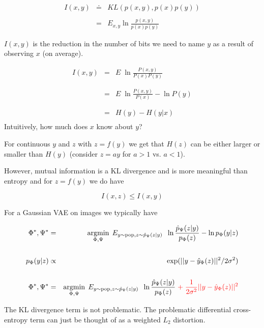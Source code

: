 {\vfill
\begin{eqnarray*}
  I(x,y) & \doteq & KL(p(x,y),p(x)p(y)) \\
  \\
  & = & E_{x,y} \ln \frac{p(x,y)}{p(x)p(y)}
\end{eqnarray*}


$I(x,y)$ is the reduction in the number of bits we need to name $y$ as a result of observing $x$ (on average).

{\huge
\begin{eqnarray*}
I(x,y) & = & E \;\ln \frac{P(x,y)}{P(x)P(y)} \\
\\
\\
& = & E \;\ln \frac{P(x,y)}{P(x)} - \ln P(y) \\
\\
\\
& = & H(y) - H(y|x) \\
\end{eqnarray*}
}
Intuitively, how much does $x$ know about $y$?


For continuous $y$ and $z$ with $z = f(y)$ we get that $H(z)$ can be either larger or smaller than $H(y)$ (consider $z = ay$ for $a >1$ vs. $a<1$).

\vfill
However, mutual information is a KL divergence and is more meaningful than entropy and for $z = f(y)$ we do have

$$I(x,z) \leq I(x,y)$$


For a Gaussian VAE on images we typically have

{\huge
\begin{eqnarray*}
\Phi^*, \Psi^* & = & \operatorname*{argmin}_{\Phi,\Psi}\; E_{y\sim\mathrm{pop},z \sim \hat{p}_\Psi(z|y)}\;\; \ln \frac{ \hat{p}_\Psi(z|y)}{p_\Phi(z)}  - \ln p_\Phi(y|z)\\
\\
p_\Phi(y|z) & \propto & \exp(||y-\hat{y}_\Phi(z)||^2/2\sigma^2) \\
\\
\Phi^*, \Psi^* & = & \operatorname*{argmin}_{\Phi,\Psi}\; E_{y\sim\mathrm{pop},z \sim \hat{p}_\Psi(z|y)}\;\; \ln \frac{ \hat{p}_\Psi(z|y)}{p_\Phi(z)}  \;{\color{red} +\; \frac{1}{2\sigma^2}||y-\hat{y}_\Phi(z)||^2}
\end{eqnarray*}
}

The KL divergence term is not problematic. The problematic differential cross-entropy term can just be thought of as a weighted $L_2$ distortion.

}
